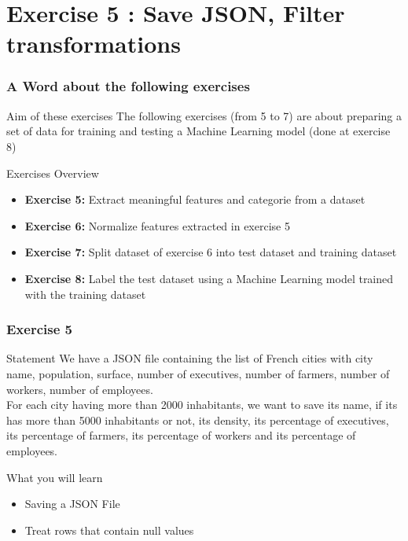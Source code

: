 \documentclass[slidetop,9pt,utf8]{beamer}
\begin{document}
\begin{CJK}{UTF8}{gbsn}
\begin{frame}[fragile]
\end{frame}

\section{Exercise 5 : Save JSON, Filter transformations}

\begin{frame}
  \frametitle{A Word about the following exercises}

  \begin{block}{Aim of these exercises}
    The following exercises (from 5 to 7) are about preparing a set of data for training and testing a Machine Learning model (done at exercise 8)
  \end{block}

  \begin{block}{Exercises Overview}
    \begin{itemize}
      \item \textbf{Exercise 5:} Extract meaningful features and categorie from a dataset
      \item \textbf{Exercise 6:} Normalize features extracted in exercise 5
      \item \textbf{Exercise 7:} Split dataset of exercise 6 into test dataset and training dataset
      \item \textbf{Exercise 8:} Label the test dataset using a Machine Learning model trained with the training dataset
    \end{itemize}
  \end{block}

\end{frame}

\begin{frame}
  \frametitle{Exercise 5}

  \begin{block}{Statement}
    We have a JSON file containing the list of French cities with city name, population, surface, number of executives, number of farmers, number of workers, number of employees. 
    \\ \medskip
    For each city having more than 2000 inhabitants, we want to save its name, if its has more than 5000 inhabitants or not, its density, its percentage of executives, its percentage of farmers, its percentage of workers and its percentage of employees.
  \end{block}

  \begin{block}{What you will learn}
    \begin{itemize}
      \item Saving a JSON File
      \item Treat rows that contain null values
    \end{itemize}
  \end{block}


\end{frame}
\end{CJK}
\end{document}
